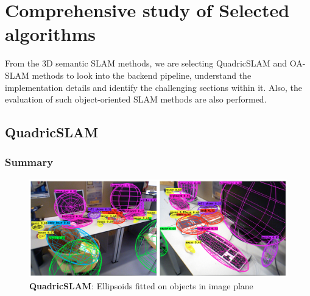 \documentclass[report.tex]{subfiles}
\begin{document}
    \chapter{Comprehensive study of Selected algorithms}

    From the 3D semantic SLAM methods, we are selecting QuadricSLAM and OA-SLAM methods to look into the backend pipeline, understand the implementation details and identify the challenging sections within it. Also, the evaluation of such object-oriented SLAM methods are also performed.


    \section{QuadricSLAM}
    \subsection{Summary}
\begin{figure}[H]
\centering
\includegraphics[width=\textwidth, height=0.3\textheight] {Images/Quadric_slam.png}
\caption{\centering\textbf{QuadricSLAM}: Ellipsoids fitted on objects in image plane\cite{quadric2}}
\label{fig:QuadricSLAM}
\end{figure}
    
\end{document}
